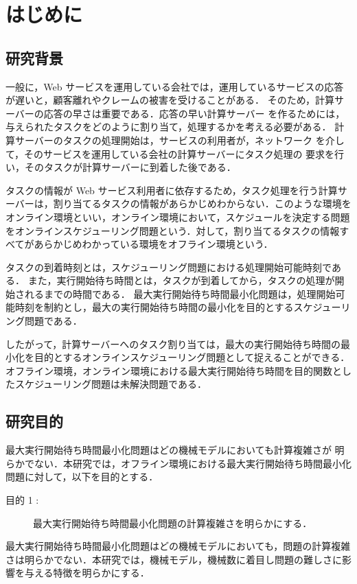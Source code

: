 \documentclass[12pt]{optlab-bachelor}
\begin{document}
\frontmatter

\chapter{はじめに}\label{c_1}
\section{研究背景}
一般に，Web サービスを運用している会社では，運用しているサービスの応答が遅いと，顧客離れやクレームの被害を受けることがある．
そのため，計算サーバーの応答の早さは重要である．応答の早い計算サーバー
を作るためには，与えられたタスクをどのように割り当て，処理するかを考える必要がある．
計算サーバーのタスクの処理開始は，サービスの利用者が，ネットワーク
を介して，そのサービスを運用している会社の計算サーバーにタスク処理の
要求を行い，そのタスクが計算サーバーに到着した後である．

タスクの情報が Web サービス利用者に依存するため，タスク処理を行う計算サーバーは，割り当てるタスクの情報があらかじめわからない．このような環境をオンライン環境といい，オンライン環境において，スケジュールを決定する問題をオンラインスケジューリング問題という．対して，割り当てるタスクの情報すべてがあらかじめわかっている環境をオフライン環境という．

タスクの到着時刻とは，スケジューリング問題における処理開始可能時刻である．
また，実行開始待ち時間とは，タスクが到着してから，タスクの処理が開始されるまでの時間である．
最大実行開始待ち時間最小化問題は，処理開始可能時刻を制約とし，最大の実行開始待ち時間の最小化を目的とするスケジューリング問題である．

したがって，計算サーバーへのタスク割り当ては，最大の実行開始待ち時間の最小化を目的とするオンラインスケジューリング問題として捉えることができる．
オフライン環境，オンライン環境における最大実行開始待ち時間を目的関数としたスケジューリング問題は未解決問題である．

\section{研究目的}
最大実行開始待ち時間最小化問題はどの機械モデルにおいても計算複雑さが
明らかでない．本研究では，オフライン環境における最大実行開始待ち時間最小化問題に対して，以下を目的とする．
\begin{description}
  \item[目的 1 :]
  最大実行開始待ち時間最小化問題の計算複雑さを明らかにする．
\end{description}

最大実行開始待ち時間最小化問題はどの機械モデルにおいても，問題の計算複雑さは明らかでない．本研究では，機械モデル，機械数に着目し問題の難しさに影響を与える特徴を明らかにする．
\end{document}
